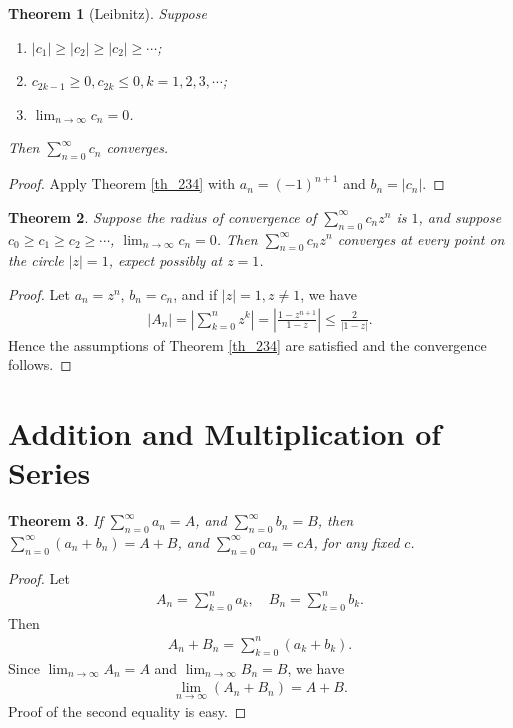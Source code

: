 \documentclass[11pt]{book}
\newtheorem{theorem}{Theorem}[chapter]
\theoremstyle{definition}
\numberwithin{equation}{chapter}
\begin{document}
\medskip

\begin{theorem}[Leibnitz]
Suppose
\begin{enumerate}[label=(\alph*)]
    \item $\left|c_1\right| \geq \left|c_2\right| \geq \left|c_2\right| \geq \cdots$;
    
    \item $c_{2k-1} \geq 0, c_{2k} \leq 0, k = 1,2,3,\cdots$;
    
    \item $\lim_{n\to\infty} c_n = 0$.
\end{enumerate}
Then $\sum^\infty_{n=0} c_n$ converges.
\end{theorem}
\begin{proof}
Apply Theorem \ref{th_234} with $a_n = (-1)^{n+1}$ and $b_n = \left|c_n\right|$.
\end{proof}

\medskip

\begin{theorem}
Suppose the radius of convergence of $\sum^\infty_{n=0} c_n z^n$ is $1$, and suppose $c_0 \geq c_1 \geq c_2 \geq \cdots$, $\lim_{n\to\infty} c_n = 0$. Then $\sum^\infty_{n=0} c_n z^n$ converges at every point on the circle $\left|z\right| = 1$, expect possibly at $z = 1$.
\end{theorem}
\begin{proof}
Let $a_n = z^n$, $b_n = c_n$, and if $\left|z\right| = 1, z \neq 1$, we have
\begin{align*}
    \left|A_n\right| = \left|\sum^n_{k=0} z^k\right| = \left|\frac{1 - z^{n+1}}{1 - z}\right| \leq \frac{2}{\left|1 - z\right|}.
\end{align*}
Hence the assumptions of Theorem \ref{th_234} are satisfied and the convergence follows.
\end{proof}

\medskip



\section{Addition and Multiplication of Series}

\begin{theorem}
If $\sum^\infty_{n=0} a_n = A$, and $\sum^\infty_{n=0} b_n = B$, then $\sum^\infty_{n=0} (a_n + b_n) = A + B$, and $\sum^\infty_{n=0} ca_n = cA$, for any fixed $c$.
\end{theorem}
\begin{proof}
Let
\begin{align*}
    A_n = \sum^n_{k=0} a_k, \quad B_n = \sum^n_{k=0} b_k.
\end{align*}
Then
\begin{align*}
    A_n + B_n = \sum^n_{k=0} (a_k + b_k).
\end{align*}
Since $\lim_{n\to\infty} A_n = A$ and $\lim_{n\to\infty} B_n = B$, we have 
\begin{align*}
    \lim_{n\to\infty}(A_n + B_n) = A + B.
\end{align*}
Proof of the second equality is easy.
\end{proof}
\end{document}
